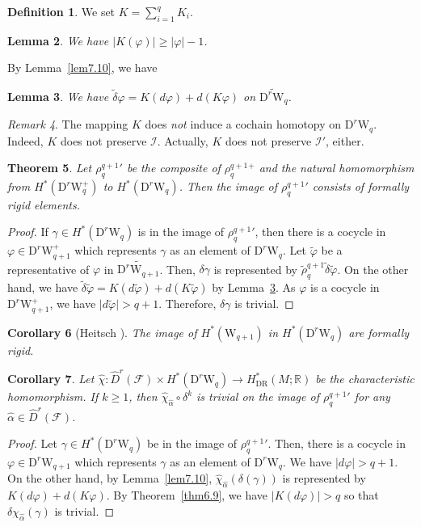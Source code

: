 \documentclass[12pt]{amsart}
\newcommand{\CF}{{\mathcal F}}
\newcommand{\R}{{\mathbb R}}
\newcommand{\W}{\mathrm{W}}
\newcommand{\D}{\mathrm{D}}
\newcommand{\norm}[1]{\lvert#1\rvert}
\newtheorem{theorem}{Theorem}[section]
\newtheorem{corollary}[theorem]{Corollary}
\newtheorem{lemma}[theorem]{Lemma}
\theoremstyle{definition}
\newtheorem{definition}[theorem]{Definition}
\theoremstyle{remark}
\newtheorem{remark}[theorem]{Remark}
\begin{document}
\begin{definition}
We set $K=\sum_{i=1}^qK_i$.
\end{definition}

\begin{lemma}
We have $\norm{K(\varphi)}\geq\norm{\varphi}-1$.
\end{lemma}

By Lemma~\ref{lem7.10}, we have
\begin{lemma}
\label{lem7.8}
We have $\widetilde{\delta}\varphi=K(d\varphi)+d(K\varphi)$ on $\widetilde{\D^r\W_q}$.
\end{lemma}

\begin{remark}
The mapping $K$ does \textit{not} induce a cochain homotopy on $\D^r\W_q$.
Indeed, $K$ does not preserve $\mathscr{I}$.
Actually, $K$ does not preserve $\mathscr{I}'$, either.
\end{remark}

\begin{theorem}
\label{thm7.25}
Let $\rho^{q+1}_q{}'$ be the composite of $\rho^{q+1}_q{}^+$ and the natural homomorphism from $H^*(\D^r\W_q^+)$ to $H^*(\D^r\W_q)$.
Then the image of $\rho^{q+1}_q{}'$ consists of formally rigid elements.
\end{theorem}
\begin{proof}
If $\gamma\in H^*(\D^r\W_q)$ is in the image of $\rho^{q+1}_q{}'$, then there is a cocycle in $\varphi\in\D^r\W_{q+1}^+$ which represents $\gamma$ as an element of $\D^r\W_q$.
Let $\widetilde\varphi$ be a representative of $\varphi$ in $\widetilde{\D^r\W_{q+1}}$.
Then, $\delta\gamma$ is represented by $\widetilde\rho^{q+1}_q\widetilde\delta\widetilde\varphi$.
On the other hand, we have $\widetilde\delta\widetilde\varphi=K(d\widetilde\varphi)+d(K\widetilde\varphi)$ by Lemma~\ref{lem7.8}.
As $\varphi$ is a cocycle in $\D^r\W_{q+1}^+$, we have $\norm{d\widetilde\varphi}>q+1$.
Therefore, $\delta\gamma$ is trivial.
\end{proof}

\begin{corollary}[Heitsch \cite{Heitsch:Topology}]
The image of $H^*(\W_{q+1})$ in $H^*(\D^r\W_q)$ are formally rigid.
\end{corollary}

\begin{corollary}
Let $\widehat\chi\colon\widehat{D}^r(\CF)\times H^*(\D^r\W_q)\to H_{\mathrm{DR}}^*(M;\R)$ be the characteristic homomorphism.
If $k\geq1$, then $\widehat\chi_{\widehat\alpha}\circ\delta^k$ is trivial on the image of $\rho^{q+1}_q{}'$ for any $\widehat\alpha\in\widehat{D}^r(\CF)$.
\end{corollary}
\begin{proof}
Let $\gamma\in H^*(\D^r\W_q)$ be in the image of $\rho^{q+1}_q{}'$.
Then, there is a cocycle in $\varphi\in\D^r\W_{q+1}$ which represents $\gamma$ as an element of $\D^r\W_q$.
We have $\norm{d\varphi}>q+1$.
On the other hand, by Lemma~\ref{lem7.10}, $\widehat\chi_{\widehat\alpha}(\delta(\gamma))$ is represented by $K(d\varphi)+d(K\varphi)$.
By Theorem~\ref{thm6.9}, we have $\norm{K(d\varphi)}>q$ so that $\delta\chi_{\widehat\alpha}(\gamma)$ is trivial.
\end{proof}
\end{document}
